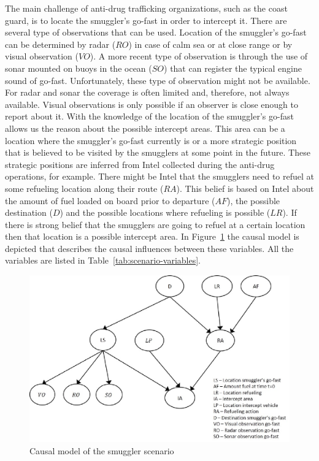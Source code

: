 \documentclass[conference]{IEEEtran}
\begin{document}
The main challenge of anti-drug trafficking organizations, such as the coast guard, is to locate the smuggler's go-fast in order to intercept it. There are several type of observations that can be used. Location of the smuggler's go-fast can be determined by radar ($RO$) in case of calm sea or at close range or by visual observation ($VO$). A more recent type of observation is through the use of sonar mounted on buoys in the ocean ($SO$) that can register the typical engine sound of go-fast. Unfortunately, these type of observation might not be available. For radar and sonar the coverage is often limited and, therefore, not always available. Visual observations is only possible if an observer is close enough to report about it. With the knowledge of the location of the smuggler's go-fast allows us the reason about the possible intercept areas. This area can be a location where the smuggler's go-fast currently is or a more strategic position that is believed to be visited by the smugglers at some point in the future. These strategic positions are inferred from Intel collected during the anti-drug operations, for example. There might be Intel that the smugglers need to refuel at some refueling location along their route ($RA$). This belief is based on Intel about the amount of fuel loaded on board prior to departure ($AF$), the possible destination ($D$) and the possible locations where refueling is possible ($LR$). If there is strong belief that the smugglers are going to refuel at a certain location then that location is a possible intercept area. In Figure~\ref{fig:causal-model} the causal model is depicted that describes the causal influences between these variables. All the variables are listed in Table~\ref{tab:scenario-variables}.


\begin{figure}
\begin{center}
 \includegraphics[width=.4\textwidth]{causal-model.eps}
 \caption{Causal model of the smuggler scenario}\label{fig:causal-model}
\end{center}
\end{figure}
\end{document}
